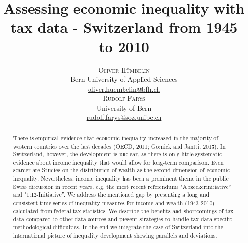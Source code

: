 \documentclass[twoside]{article}\usepackage[]{graphicx}\usepackage[]{color}
\title{\vspace{-15mm}\fontsize{24pt}{10pt}\selectfont\textbf{Assessing economic inequality with tax data - Switzerland from 1945 to 2010}} %
\author{
\large
\textsc{Oliver Hümbelin}\\[2mm] %
\normalsize Bern University of Applied Sciences \\ %
\normalsize \href{mailto:oliver.huembelin@bfh.ch}{oliver.huembelin@bfh.ch} %
\vspace{5mm}\\
\large
\textsc{Rudolf Farys}\\[2mm] %
\normalsize University of Bern \\ %
\normalsize \href{mailto:rudolf.farys@soz.unibe.ch}{rudolf.farys@soz.unibe.ch} %
\vspace{-5mm}
}
\date{}
\begin{document}
\maketitle 

\thispagestyle{fancy} %





\begin{abstract}

There is empirical evidence that economic inequality increased in the majority of western countries over the last decades (OECD, 2011; Gornick and Jäntti, 2013). In Switzerland, however, the development is unclear, as there is only little systematic evidence about income inequality that would allow for long-term comparison. Even scarcer are Studies on the distribution of wealth as the second dimension of economic inequality. Nevertheless, income inequality has been a prominent theme in the public Swiss discussion in recent years, e.g. the most recent referendums "Abzockerinitiative'' and "1:12-Initiative''. We address the mentioned gap by presenting a long and consistent time series of inequality measures for income and wealth (1943-2010) calculated from federal tax statistics. We describe the benefits and shortcomings of tax data compared to other data sources and present strategies to handle tax data specific methodological difficulties. In the end we integrate the case of Switzerland into the international picture of inequality development showing parallels and deviations.


\end{abstract}




\end{document}

